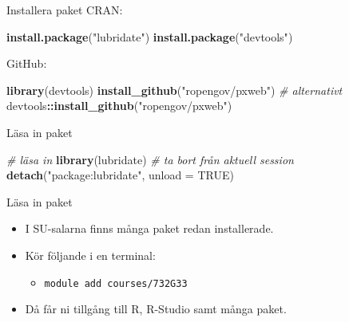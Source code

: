 \documentclass[
  11pt,
  ignorenonframetext,
]{beamer}
\newenvironment{Shaded}{\begin{snugshade}}{\end{snugshade}}
\newcommand{\AttributeTok}[1]{\textcolor[rgb]{0.13,0.29,0.53}{#1}}
\newcommand{\CommentTok}[1]{\textcolor[rgb]{0.56,0.35,0.01}{\textit{#1}}}
\newcommand{\ConstantTok}[1]{\textcolor[rgb]{0.56,0.35,0.01}{#1}}
\newcommand{\FunctionTok}[1]{\textcolor[rgb]{0.13,0.29,0.53}{\textbf{#1}}}
\newcommand{\NormalTok}[1]{#1}
\newcommand{\SpecialCharTok}[1]{\textcolor[rgb]{0.81,0.36,0.00}{\textbf{#1}}}
\newcommand{\StringTok}[1]{\textcolor[rgb]{0.31,0.60,0.02}{#1}}
\providecommand{\tightlist}{%
  \setlength{\itemsep}{0pt}\setlength{\parskip}{0pt}}
\begin{document}
\begin{frame}[fragile]{Installera paket}
\label{installera-paket}
CRAN:

\begin{Shaded}
\begin{Highlighting}[]
\FunctionTok{install.package}\NormalTok{(}\StringTok{"lubridate"}\NormalTok{)}
\FunctionTok{install.package}\NormalTok{(}\StringTok{"devtools"}\NormalTok{)}
\end{Highlighting}
\end{Shaded}

GitHub:

\begin{Shaded}
\begin{Highlighting}[]
\FunctionTok{library}\NormalTok{(devtools)}
\FunctionTok{install\_github}\NormalTok{(}\StringTok{"ropengov/pxweb"}\NormalTok{)}
\CommentTok{\# alternativt}
\NormalTok{devtools}\SpecialCharTok{::}\FunctionTok{install\_github}\NormalTok{(}\StringTok{"ropengov/pxweb"}\NormalTok{)}
\end{Highlighting}
\end{Shaded}
\end{frame}

\begin{frame}[fragile]{Läsa in paket}
\label{luxe4sa-in-paket}
\begin{Shaded}
\begin{Highlighting}[]
\CommentTok{\# läsa in}
\FunctionTok{library}\NormalTok{(lubridate)}
\CommentTok{\# ta bort från aktuell session}
\FunctionTok{detach}\NormalTok{(}\StringTok{"package:lubridate"}\NormalTok{, }\AttributeTok{unload =} \ConstantTok{TRUE}\NormalTok{)}
\end{Highlighting}
\end{Shaded}
\end{frame}

\begin{frame}{Läsa in paket}
\label{luxe4sa-in-paket-1}
\begin{itemize}
\tightlist
\item
  I SU-salarna finns många paket redan installerade.
\item
  Kör följande i en terminal:

  \begin{itemize}
  \tightlist
  \item
    \texttt{module add courses/732G33}
  \end{itemize}
\item
  Då får ni tillgång till R, R-Studio samt många paket.
\end{itemize}
\end{frame}
\end{document}
